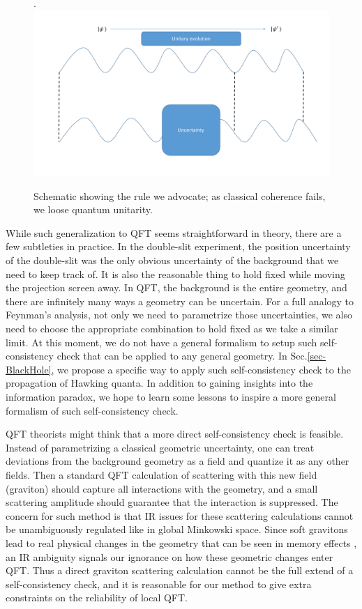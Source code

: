 \documentclass[aps,showpacs,twocolumn,floats,prd,superscriptaddress,nofootinbib]{revtex4-1}
\begin{document}
\begin{figure}[h!]
\begin{center}.
\includegraphics[scale = 0.5]{bh_coherence.pdf}
\caption{Schematic showing the rule we advocate; as classical coherence fails, we loose quantum unitarity.}
\label{fig-QFT}
\end{center}
\end{figure}

While such generalization to QFT seems straightforward in theory, there are a few subtleties in practice.
In the double-slit experiment, the position uncertainty of the double-slit was the only obvious uncertainty of the background that we need to keep track of.
It is also the reasonable thing to hold fixed while moving the projection screen away.
In QFT, the background is the entire geometry, and there are infinitely many ways a geometry can be uncertain.
For a full analogy to Feynman's analysis, not only we need to parametrize those uncertainties, we also need to choose the appropriate combination to hold fixed as we take a similar limit.
At this moment, we do not have a general formalism to setup such self-consistency check that can be applied to any general geometry. 
In Sec.\ref{sec-BlackHole}, we propose a specific way to apply such self-consistency check to the propagation of Hawking quanta.
In addition to gaining insights into the information paradox, we hope to learn some lessons to inspire a more general formalism of such self-consistency check.

QFT theorists might think that a more direct self-consistency check is feasible.
Instead of parametrizing a classical geometric uncertainty, one can treat deviations from the background geometry as a field and quantize it as any other fields.
Then a standard QFT calculation of scattering with this new field (graviton) should capture all interactions with the geometry, and a small scattering amplitude should guarantee that the interaction is suppressed. 
The concern for such method is that IR issues for these scattering calculations cannot be unambiguously regulated like in global Minkowski space.
Since soft gravitons lead to real physical changes in the geometry that can be seen in memory effects \cite{Wei65,HeLys14}, an IR ambiguity signals our ignorance on how these geometric changes enter QFT.
Thus a direct graviton scattering calculation cannot be the full extend of a self-consistency check, and it is reasonable for our method to give extra constraints on the reliability of local QFT.
\end{document}
